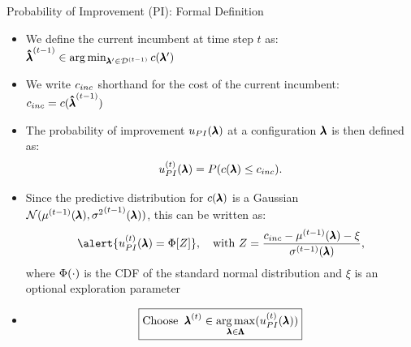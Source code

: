 \begin{frame}[c]{Probability of Improvement (PI): Formal Definition}
\begin{itemize}
    \item We define the \alert{current incumbent at time step $t$} as: 
    $\incumbent[\bocount-1]\in\argmin_{\conf'\in\iter[\bocount-1]{\dataset}}\obs[\conf']$
    \item We write \alert{$\cost_{inc}$} shorthand for the \alert{cost of the current incumbent}: 
    $c_{inc} = \cost(\incumbent[\bocount-1])$
\smallskip
        \item The \alert{probability of improvement $\acq_{PI}(\conf)$} at a configuration $\conf$ is then defined as: 
        \alert{\[\iter{\acq}_{PI}(\conf) = P(\cost(\conf) \leq \cost_{inc}).\]}
    \vspace*{-0.5cm}
    \fhpause
    \item Since the predictive distribution for $\cost(\conf)$ is a Gaussian $\normaldist(\iter[\bocount-1]{\mean}(\conf), \iter[\bocount-1]{\variance}(\conf))$, this can be written as:
    \[
        \alert{\iter{\acq}_{PI}(\conf) = \cdf[Z]}, \quad \text{with } Z = \dfrac{\cost_{inc} - \iter[\bocount-1]{\mean}(\conf) - \xi}{\iter[\bocount-1]{\stddev}(\conf)}, 
    \]
    \newline
    where $\cdf(\cdot)$ is the CDF of the standard normal distribution and $\xi$ is an optional exploration parameter
    \fhpause
    \item[] \[\boxed{\text{Choose}\;\;\bonextsample \in \argmax_{\conf\in\pcs}(\iter{\acq}_{PI}(\conf))}\]
\end{itemize}
\end{frame}
